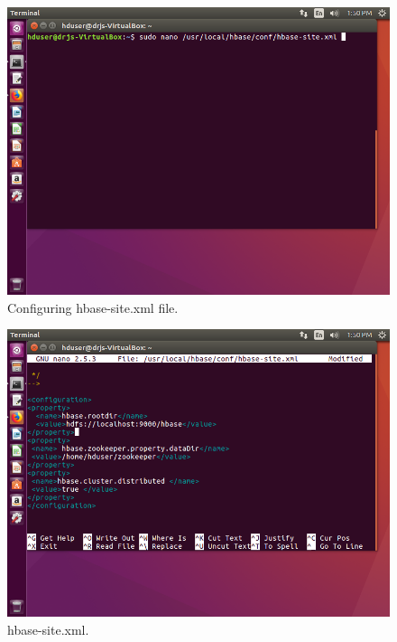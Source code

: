 \documentclass[a4paper,10pt]{article}
\begin{document}
\begin{figure}[h]
	\includegraphics[scale=0.33,center]{8.png}
	\caption{Configuring hbase-site.xml file.}
	\label{fig:09}
\end{figure}

\begin{figure}[h]
	\includegraphics[scale=0.33,center]{9.png}
	\caption{hbase-site.xml.}
	\label{fig:10}
\end{figure}
\end{document}
